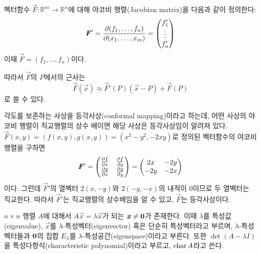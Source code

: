 \documentclass[sections/engineering_mathematics_lecture_note.tex]{subfiles}
\begin{document}
\begin{definition}
    벡터함수 $\vec F: \mathbb R^m \rightarrow \mathbb R^n$에 대해 야코비 행렬(Jacobian matrix)을 다음과 같이 정의한다:
    \begin{equation*}
        \bm{\mathit{F}}' = \pdv{(f_1, \dots, f_n)}{(x_1, \dots, x_m)} =
        \begin{pmatrix}
            f_1' \\ \vdots \\ f_n'
        \end{pmatrix}
    \end{equation*}
    이때 $\vec F = (f_1, \dots, f_n)$이다.
\end{definition}

따라서 $\vec F$의 $P$에서의 근사는
\begin{equation*}
    \vec F(\vec x) \approx \vec F'(P) (\vec x - P) + \vec F(P)
\end{equation*}
로 쓸 수 있다.

\begin{example}
    각도를 보존하는 사상을 등각사상(conformal mapping)이라고 하는데, 어떤 사상의 야코비 행렬이 직교행렬의 상수 배이면 해당 사상은 등각사상임이 알려져 있다.
    $\vec F(x, y) = (f(x, y), g(x, y)) = (x^2 - y^2, -2xy)$로 정의된 벡터함수의 야코비 행렬을 구하면
    \begin{equation*}
        \bm{\mathit{F}}' =
        \begin{pmatrix}
            \pdv{f}{x} & \pdv{f}{y}\\
            \pdv{g}{x} & \pdv{g}{y}
        \end{pmatrix}
        =
        \begin{pmatrix}
            2x & -2y\\
            -2y & -2x
        \end{pmatrix}
    \end{equation*}
    이다.
    그런데 $\vec F'$의 열벡터 $2(x, -y)$와 $2(-y, -x)$의 내적이 0이므로 두 열벡터는 직교한다.
    따라서 $\vec F'$는 직교행렬의 상수배임을 알 수 있고, $\vec F$는 등각사상이다.
\end{example}

\begin{definition}
    $n \times n$ 행렬 $A$에 대해서 $A \vec x = \lambda \vec x$가 되는 $\bm{\mathit{x}} \neq \bm{\mathrm{0}}$가 존재한다.
    이때 $\lambda$를 특성값(eigenvalue), $\vec x$를 $\lambda$-특성벡터(eigenvector) 혹은 단순히 특성벡터라고 부르며, $\lambda$-특성벡터들과 $\bm{\mathrm{0}}$의 집합 $E_\lambda$를 $\lambda$-특성공간(eigenspace)이라고 부른다.
    또한 $\det (A - \lambda I)$을 특성다항식(characteristic polynomial)이라고 부르고, $\operatorname{char} A$라고 쓴다.
\end{definition}
\end{document}

